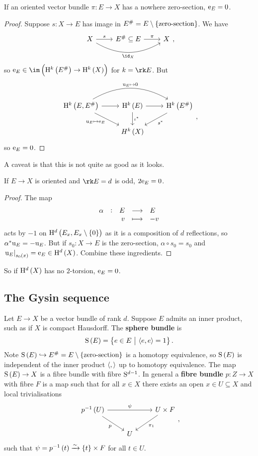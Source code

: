 \begin{lemma}
If an oriented vector bundle $ \pi : E \to X $ has a nowhere zero-section, $ \e_E = 0 $.
\end{lemma}

\begin{proof}
Suppose $ s : X \to E $ has image in $ E^\# = E \setminus \cbr{\text{zero-section}} $. We have
$$
\begin{tikzcd}
X \arrow{r}{s} \arrow[bend right=30]{rr}[swap]{\id_X} & E^\# \subseteq E \arrow{r}{\pi} & X
\end{tikzcd},
$$
so $ \e_E \in \im \br{\H^k\br{E^\#} \to \H^k\br{X}} $ for $ k = \rk E $. But
$$
\begin{tikzcd}
\H^k\br{E, E^\#} \arrow{r} \arrow[bend left=30]{rr}{\u_E \mapsto 0} \arrow{dr}[swap]{\u_E \mapsto \e_E} & \H^k\br{E} \arrow{r} \arrow{d}{\iota^*} & \H^k\br{E^\#} \arrow{dl}{s^*} \\
& H^k\br{X} &
\end{tikzcd},
$$
so $ \e_E = 0 $.
\end{proof}

A caveat is that this is not quite as good as it looks.

\begin{lemma}
If $ E \to X $ is oriented and $ \rk E = d $ is odd, $ 2\e_E = 0 $.
\end{lemma}

\begin{proof}
The map
$$ \function[\alpha]{E}{E}{v}{-v} $$
acts by $ -1 $ on $ \H^d\br{E_x, E_x \setminus \cbr{0}} $ as it is a composition of $ d $ reflections, so $ \alpha^*\u_E = -\u_E $. But if $ s_0 : X \to E $ is the zero-section, $ \alpha \circ s_0 = s_0 $ and $ \eval{\u_E}_{s_0\br{x}} = \e_E \in \H^d\br{X} $. Combine these ingredients.
\end{proof}

So if $ \H^d\br{X} $ has no $ 2 $-torsion, $ \e_E = 0 $.

\subsection{The Gysin sequence}

Let $ E \to X $ be a vector bundle of rank $ d $. Suppose $ E $ admits an inner product, such as if $ X $ is compact Hausdorff. The \textbf{sphere bundle} is
$$ \S\br{E} = \cbr{e \in E \st \abr{e, e} = 1}. $$
Note $ \S\br{E} \hookrightarrow E^\# = E \setminus \cbr{\text{zero-section}} $ is a homotopy equivalence, so $ \S\br{E} $ is independent of the inner product $ \abr{,} $ up to homotopy equivalence. The map $ \S\br{E} \to X $ is a fibre bundle with fibre $ \S^{d - 1} $. In general a \textbf{fibre bundle} $ p : Z \to X $ with fibre $ F $ is a map such that for all $ x \in X $ there exists an open $ x \in U \subseteq X $ and local trivialisations
$$
\begin{tikzcd}
p^{-1}\br{U} \arrow{rr}{\psi} \arrow{dr}[swap]{p} & & U \times F \arrow{dl}{\pi_1} \\
& U &
\end{tikzcd},
$$
such that $ \psi = p^{-1}\br{t} \xrightarrow{\sim} \cbr{t} \times F $ for all $ t \in U $.

